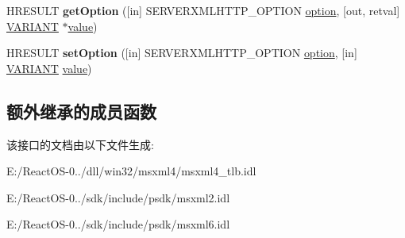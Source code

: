 \begin{DoxyCompactItemize}
H\+R\+E\+S\+U\+LT {\bfseries get\+Option} (\mbox{[}in\mbox{]} S\+E\+R\+V\+E\+R\+X\+M\+L\+H\+T\+T\+P\+\_\+\+O\+P\+T\+I\+ON \hyperlink{structoption}{option}, \mbox{[}out, retval\mbox{]} \hyperlink{structtag_v_a_r_i_a_n_t}{V\+A\+R\+I\+A\+NT} $\ast$\hyperlink{unionvalue}{value})
\item 
\mbox{\label{interface_m_s_x_m_l2_1_1_i_server_x_m_l_h_t_t_p_request_a82f2ad35ab8cf252499f1ee5e2f647d2}} 
H\+R\+E\+S\+U\+LT {\bfseries set\+Option} (\mbox{[}in\mbox{]} S\+E\+R\+V\+E\+R\+X\+M\+L\+H\+T\+T\+P\+\_\+\+O\+P\+T\+I\+ON \hyperlink{structoption}{option}, \mbox{[}in\mbox{]} \hyperlink{structtag_v_a_r_i_a_n_t}{V\+A\+R\+I\+A\+NT} \hyperlink{unionvalue}{value})
\end{DoxyCompactItemize}
\subsection*{额外继承的成员函数}


该接口的文档由以下文件生成\+:\begin{DoxyCompactItemize}
\item 
E\+:/\+React\+O\+S-\/0../dll/win32/msxml4/msxml4\+\_\+tlb.\+idl\item 
E\+:/\+React\+O\+S-\/0../sdk/include/psdk/msxml2.\+idl\item 
E\+:/\+React\+O\+S-\/0../sdk/include/psdk/msxml6.\+idl\end{DoxyCompactItemize}
